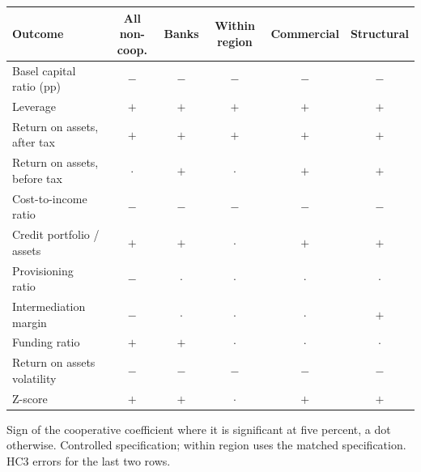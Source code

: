 \begin{tabular}{lccccc}
\toprule
Outcome & All non-coop. & Banks & Within region & Commercial & Structural \\
\midrule
Basel capital ratio (pp) & $-$ & $-$ & $-$ & $-$ & $-$ \\
Leverage & $+$ & $+$ & $+$ & $+$ & $+$ \\
Return on assets, after tax & $+$ & $+$ & $+$ & $+$ & $+$ \\
Return on assets, before tax & $\cdot$ & $+$ & $\cdot$ & $+$ & $+$ \\
Cost-to-income ratio & $-$ & $-$ & $-$ & $-$ & $-$ \\
Credit portfolio / assets & $+$ & $+$ & $\cdot$ & $+$ & $+$ \\
Provisioning ratio & $-$ & $\cdot$ & $\cdot$ & $\cdot$ & $\cdot$ \\
Intermediation margin & $-$ & $\cdot$ & $\cdot$ & $\cdot$ & $+$ \\
Funding ratio & $+$ & $+$ & $\cdot$ & $\cdot$ & $\cdot$ \\
\midrule
Return on assets volatility & $-$ & $-$ & $-$ & $-$ & $-$ \\
Z-score & $+$ & $+$ & $\cdot$ & $+$ & $+$ \\
\bottomrule
\end{tabular}
\begin{tablenotes}[flushleft]\footnotesize
\item Sign of the cooperative coefficient where it is significant at five percent, a dot otherwise. Controlled specification; within region uses the matched specification. HC3 errors for the last two rows.
\end{tablenotes}
